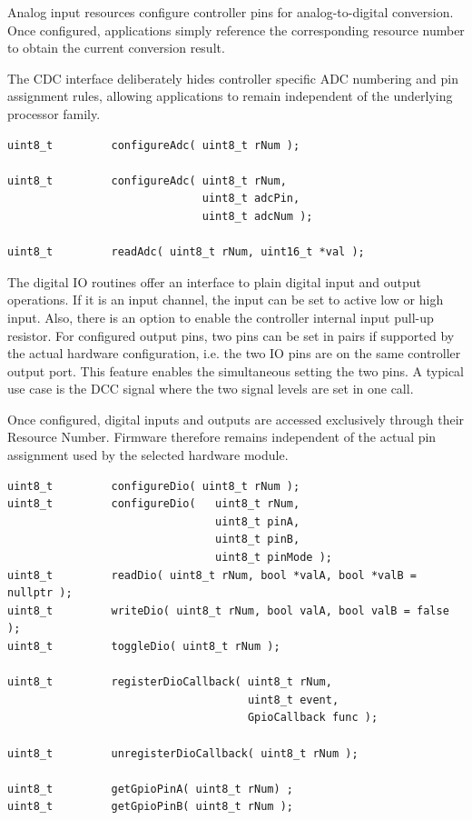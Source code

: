 
Analog input resources configure controller pins for analog-to-digital
conversion. Once configured, applications simply reference the corresponding
resource number to obtain the current conversion result.

The CDC interface deliberately hides controller specific ADC numbering and pin
assignment rules, allowing applications to remain independent of the underlying
processor family.

\lstset{language=c++, style=api-interface}
\begin{lstlisting}
uint8_t         configureAdc( uint8_t rNum );

uint8_t         configureAdc( uint8_t rNum, 
                              uint8_t adcPin, 
                              uint8_t adcNum );

uint8_t         readAdc( uint8_t rNum, uint16_t *val );
\end{lstlisting}
\FloatBarrier



The digital IO routines offer an interface to plain digital input and output 
operations. If it is an input channel, the input can be set to active low or high
input. Also, there is an option to enable the controller internal input pull-up 
resistor. For configured output pins, two pins can be set in pairs if supported 
by the actual hardware configuration, i.e. the two IO pins are on the same 
controller output port. This feature enables the simultaneous setting the two
pins. A typical use case is the DCC signal where the two signal levels are set in
one call.

Once configured, digital inputs and outputs are accessed exclusively through
their Resource Number. Firmware therefore remains independent of the actual pin
assignment used by the selected hardware module.

\lstset{language=c++, style=api-interface}
\begin{lstlisting}
uint8_t         configureDio( uint8_t rNum );
uint8_t         configureDio(   uint8_t rNum, 
                                uint8_t pinA, 
                                uint8_t pinB, 
                                uint8_t pinMode );
uint8_t         readDio( uint8_t rNum, bool *valA, bool *valB = nullptr );
uint8_t         writeDio( uint8_t rNum, bool valA, bool valB = false );
uint8_t         toggleDio( uint8_t rNum );

uint8_t         registerDioCallback( uint8_t rNum, 
                                     uint8_t event, 
                                     GpioCallback func );
                                     
uint8_t         unregisterDioCallback( uint8_t rNum );

uint8_t         getGpioPinA( uint8_t rNum) ;
uint8_t         getGpioPinB( uint8_t rNum );
\end{lstlisting}
\FloatBarrier

